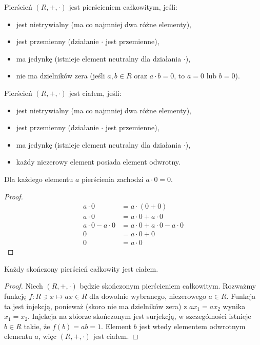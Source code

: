 \documentclass[polish,pretty,bibliography=totocnumbered]{angav}
\begin{document}
\begin{definition}
    Pierścień $(R, +, \cdot)$ jest pierścieniem całkowitym, jeśli:
    \begin{itemize}[nosep]
        \item jest nietrywialny (ma co najmniej dwa różne elementy),
        \item jest przemienny (działanie $\cdot$ jest przemienne),
        \item ma jedynkę (istnieje element neutralny dla działania $\cdot$),
        \item nie ma dzielników zera (jeśli $a, b \in R$ oraz $a \cdot b = 0$, to $a = 0$ lub $b = 0$).
    \end{itemize}
\end{definition}

\begin{definition}[ciało]
    Pierścień $(R, +, \cdot)$ jest ciałem, jeśli:
    \begin{itemize}[nosep]
        \item jest nietrywialny (ma co najmniej dwa różne elementy),
        \item jest przemienny (działanie $\cdot$ jest przemienne),
        \item ma jedynkę (istnieje element neutralny dla działania $\cdot$),
        \item każdy niezerowy element posiada element odwrotny.
    \end{itemize}
\end{definition}

\begin{fact}
    Dla każdego elementu $a$ pierścienia zachodzi $a \cdot 0 = 0$.
\end{fact}
\begin{proof}
    \begin{align*}
        a \cdot 0 &= a \cdot (0 + 0) \\
        a \cdot 0 &= a \cdot 0 + a \cdot 0 \\
        a \cdot 0 - a \cdot 0 &= a \cdot 0 + a \cdot 0 - a \cdot 0 \\
        0 &= a \cdot 0 + 0 \\
        0 &= a \cdot 0
    \end{align*}
\end{proof}

\begin{theorem}
    Każdy skończony pierścień całkowity jest ciałem.
\end{theorem}
\begin{proof}
    Niech $(R, +, \cdot)$ będzie skończonym pierścieniem całkowitym.
    Rozważmy funkcję $f : R \ni x \mapsto ax \in R$ dla dowolnie wybranego, niezerowego $a \in R$. Funkcja ta jest injekcją, ponieważ (skoro nie ma dzielników zera) z $ax_1 = ax_2$ wynika $x_1 = x_2$. Injekcja na zbiorze skończonym jest surjekcją, w szczególności istnieje $b \in R$ takie, że $f(b) = ab = 1$. Element $b$ jest wtedy elementem odwrotnym elementu $a$, więc $(R, +, \cdot)$ jest ciałem.
\end{proof}
\end{document}
